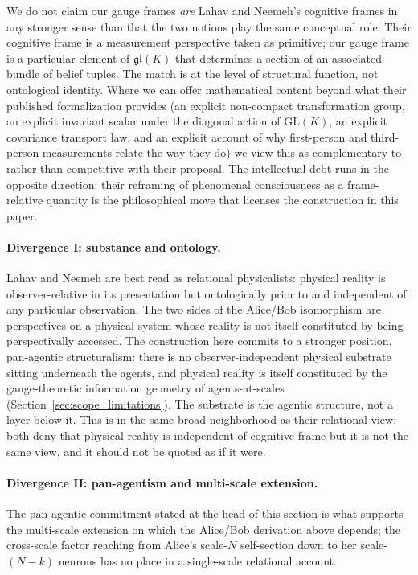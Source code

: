 \documentclass[11pt]{article}
\begin{document}
We do not claim our gauge frames \emph{are} Lahav and Neemeh's cognitive frames in any stronger sense than that the two notions play the same conceptual role. Their cognitive frame is a measurement perspective taken as primitive; our gauge frame is a particular element of $\mathfrak{gl}(K)$ that determines a section of an associated bundle of belief tuples. The match is at the level of structural function, not ontological identity. Where we can offer mathematical content beyond what their published formalization provides  (an explicit non-compact transformation group, an explicit invariant scalar under the diagonal action of $\mathrm{GL}(K)$, an explicit covariance transport law, and an explicit account of why first-person and third-person measurements relate the way they do) we view this as complementary to rather than competitive with their proposal. The intellectual debt runs in the opposite direction: their reframing of phenomenal consciousness as a frame-relative quantity is the philosophical move that licenses the construction in this paper.

\paragraph{Divergence I: substance and ontology.}
Lahav and Neemeh are best read as relational physicalists: physical reality is observer-relative in its presentation but ontologically prior to and independent of any particular observation. The two sides of the Alice/Bob isomorphism are perspectives on a physical system whose reality is not itself constituted by being perspectivally accessed. The construction here commits to a stronger position, pan-agentic structuralism: there is no observer-independent physical substrate sitting underneath the agents, and physical reality is itself constituted by the gauge-theoretic information geometry of agents-at-scales (Section~\ref{sec:scope_limitations}). The substrate is the agentic structure, not a layer below it. This is in the same broad neighborhood as their relational view: both deny that physical reality is independent of cognitive frame but it is not the same view, and it should not be quoted as if it were.

\paragraph{Divergence II: pan-agentism and multi-scale extension.}
The pan-agentic commitment stated at the head of this section is what supports the multi-scale extension on which the Alice/Bob derivation above depends; the cross-scale factor reaching from Alice's scale-$N$ self-section down to her scale-$(N-k)$ neurons has no place in a single-scale relational account.
\end{document}
